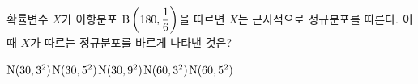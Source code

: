 확률변수 $X$가 이항분포 $\mathrm{B}\left(180{,}\mkern3mu\mathopen{}\dfrac{1}{6}\right)$을 따르면 $X$는 근사적으로 정규분포를 따른다. 이때 $X$가 따르는 정규분포를 바르게 나타낸 것은?
\begin{choices32}{$\mathrm{N}(30{,}\mkern3mu\mathopen{}3^2)$}{$\mathrm{N}(30{,}\mkern3mu\mathopen{}5^2)$}{$\mathrm{N}(30{,}\mkern3mu\mathopen{}9^2)$}{$\mathrm{N}(60{,}\mkern3mu\mathopen{}3^2)$}{$\mathrm{N}(60{,}\mkern3mu\mathopen{}5^2)$}\end{choices32}
